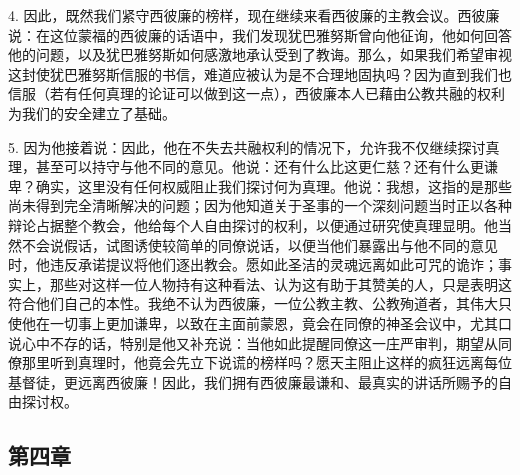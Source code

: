 4. 因此，既然我们紧守西彼廉的榜样，现在继续来看西彼廉的主教会议。西彼廉说：在这位蒙福的西彼廉的话语中，我们发现犹巴雅努斯曾向他征询，他如何回答他的问题，以及犹巴雅努斯如何感激地承认受到了教诲。那么，如果我们希望审视这封使犹巴雅努斯信服的书信，难道应被认为是不合理地固执吗？因为直到我们也信服（若有任何真理的论证可以做到这一点），西彼廉本人已藉由公教共融的权利为我们的安全建立了基础。\par

5. 因为他接着说：因此，他在不失去共融权利的情况下，允许我不仅继续探讨真理，甚至可以持守与他不同的意见。他说：还有什么比这更仁慈？还有什么更谦卑？确实，这里没有任何权威阻止我们探讨何为真理。他说：我想，这指的是那些尚未得到完全清晰解决的问题；因为他知道关于圣事的一个深刻问题当时正以各种辩论占据整个教会，他给每个人自由探讨的权利，以便通过研究使真理显明。他当然不会说假话，试图诱使较简单的同僚说话，以便当他们暴露出与他不同的意见时，他违反承诺提议将他们逐出教会。愿如此圣洁的灵魂远离如此可咒的诡诈；事实上，那些对这样一位人物持有这种看法、认为这有助于其赞美的人，只是表明这符合他们自己的本性。我绝不认为西彼廉，一位公教主教、公教殉道者，其伟大只使他在一切事上更加谦卑，以致在主面前蒙恩，竟会在同僚的神圣会议中，尤其口说心中不存的话，特别是他又补充说：当他如此提醒同僚这一庄严审判，期望从同僚那里听到真理时，他竟会先立下说谎的榜样吗？愿天主阻止这样的疯狂远离每位基督徒，更远离西彼廉！因此，我们拥有西彼廉最谦和、最真实的讲话所赐予的自由探讨权。\par


\subsection{第四章}

